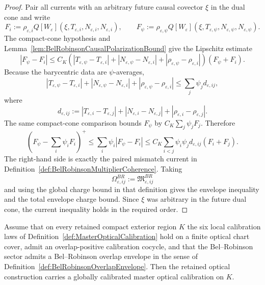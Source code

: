 \begin{proof}
Pair all currents with an arbitrary future causal covector $\xi$ in the dual cone and write
\[
    F_i
    :=
    \rho_{\varepsilon,i}Q[W_\varepsilon](\xi,T_{\varepsilon,i},N_{\varepsilon,i},N_{\varepsilon,i}),
    \qquad
    F_\psi
    :=
    \rho_{\varepsilon,\psi}Q[W_\varepsilon](\xi,T_{\varepsilon,\psi},N_{\varepsilon,\psi},N_{\varepsilon,\psi}).
\]
The compact-cone hypothesis and Lemma~\ref{lem:BelRobinsonCausalPolarizationBound} give the Lipschitz estimate
\[
    |F_\psi-F_i|
    \le
    C_K
    \left(
        |T_{\varepsilon,\psi}-T_{\varepsilon,i}|
        +
        |N_{\varepsilon,\psi}-N_{\varepsilon,i}|
        +
        |\rho_{\varepsilon,\psi}-\rho_{\varepsilon,i}|
    \right)
    \left(F_\psi+F_i\right).
\]
Because the barycentric data are $\psi$-averages,
\[
    |T_{\varepsilon,\psi}-T_{\varepsilon,i}|
    +
    |N_{\varepsilon,\psi}-N_{\varepsilon,i}|
    +
    |\rho_{\varepsilon,\psi}-\rho_{\varepsilon,i}|
    \le
    \sum_j\psi_j d_{\varepsilon,ij},
\]
where
\[
    d_{\varepsilon,ij}:=
        |T_{\varepsilon,i}-T_{\varepsilon,j}|
        +
        |N_{\varepsilon,i}-N_{\varepsilon,j}|
        +
        |\rho_{\varepsilon,i}-\rho_{\varepsilon,j}|.
\]
The same compact-cone comparison bounds $F_\psi$ by $C_K\sum_j\psi_jF_j$. Therefore
\[
    \left(F_\psi-\sum_i\psi_iF_i\right)^+
    \le
    \sum_i\psi_i|F_\psi-F_i|
    \le
    C_K\sum_{i<j}\psi_i\psi_jd_{\varepsilon,ij}(F_i+F_j).
\]
The right-hand side is exactly the paired mismatch current in Definition~\ref{def:BelRobinsonMultiplierCoherence}. Taking
\[
    \Omega^{BR}_{\varepsilon,ij}:=\mathfrak M^{BR}_{\varepsilon,ij}
\]
and using the global charge bound in that definition gives the envelope inequality and the total envelope charge bound. Since $\xi$ was arbitrary in the future dual cone, the current inequality holds in the required order.
\end{proof}

\begin{lemma}\label{lem:NonnegativeOverlapGluing}
Assume that on every retained compact exterior region $K$ the six local calibration laws of Definition~\ref{def:MasterOpticalCalibration} hold on a finite optical chart cover, admit an overlap-positive calibration cocycle, and that the Bel--Robinson sector admits a Bel--Robinson overlap envelope in the sense of Definition~\ref{def:BelRobinsonOverlapEnvelope}. Then the retained optical construction carries a globally calibrated master optical calibration on $K$.
\end{lemma}

